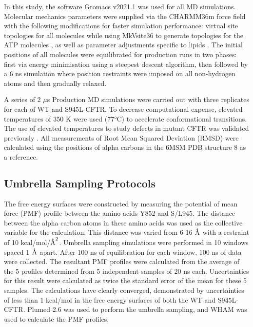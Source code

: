 In this study, the software Gromacs v2021.1 \cite{abraham2015} was used for all MD simulations. Molecular mechanics parameters were supplied via the CHARMM36m \cite{huang2016} force field with the following modifications for faster simulation performance: virtual site topologies \cite{feenstra1999} for all molecules while using MkVsite36 to generate topologies for the ATP molecules \cite{larsson2020}, as well as parameter adjustments specific to lipids \cite{olesen2018}. The initial positions of all molecules were equilibrated for production runs in two phases: first via energy minimisation using a steepest descent algorithm, then followed by a 6 ns simulation where position restraints were imposed on all non-hydrogen atoms and then gradually relaxed. 

A series of 2 $\mu$s Production MD simulations were carried out with three replicates for each of WT and S945L-CFTR. To decrease computational expense, elevated temperatures of 350 K were used (77°C) to accelerate conformational transitions. The use of elevated temperatures to study defects in mutant CFTR was validated previously \cite{wong2022}. All measurements of Root Mean Squared Deviation (RMSD) were calculated using the positions of alpha carbons in the 6MSM PDB structure 8 as a reference. 

\subsection{Umbrella Sampling Protocols}
The free energy surfaces were constructed by measuring the potential of mean force (PMF) profile between the amino acids Y852 and S/L945. The distance between the alpha carbon atoms in these amino acids was used as the collective variable for the calculation. This distance was varied from 6-16 $\mbox{\textup{\AA}}$ with a restraint of 10 kcal/mol/$\mbox{\textup{\AA}}^2$. Umbrella sampling simulations were performed in 10 windows spaced 1 $\mbox{\textup{\AA}}$ apart. After 100 ns of equilibration for each window, 100 ns of data were collected. The resultant PMF profiles were calculated from the average of the 5 profiles determined from 5 independent samples of 20 ns each. Uncertainties for this result were calculated as twice the standard error of the mean for these 5 samples. The calculations have clearly converged, demonstrated by uncertainties of less than 1 kcal/mol in the free energy surfaces of both the WT and S945L-CFTR. Plumed 2.6 \cite{bonomi2009, tribello2014, bonomi2019} was used to perform the umbrella sampling, and WHAM \cite{grossfield2012} was used to calculate the PMF profiles. 
